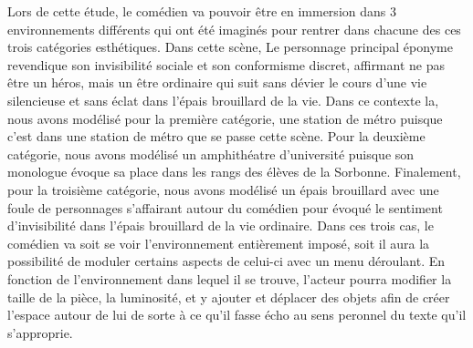 Lors de cette étude, le comédien va pouvoir être en immersion dans 3 environnements différents qui ont été imaginés pour rentrer
dans chacune des ces trois catégories esthétiques. Dans cette scène, Le personnage principal éponyme revendique son invisibilité 
sociale et son conformisme discret, affirmant ne pas être un héros, mais un être ordinaire qui suit sans dévier le cours d'une vie
silencieuse et sans éclat dans l'épais brouillard de la vie. Dans ce contexte la, nous avons modélisé pour la première catégorie, une 
station de métro puisque c'est dans une station de métro que se passe cette scène. Pour la deuxième catégorie, nous avons modélisé un
amphithéatre d'université puisque son monologue évoque sa place dans les rangs des élèves de la Sorbonne. Finalement, pour la troisième 
catégorie, nous avons modélisé un épais brouillard avec une foule de personnages s'affairant autour du comédien pour évoqué le sentiment d'invisibilité dans l'épais brouillard de la vie ordinaire.
Dans ces trois cas, le comédien va soit se voir l'environnement entièrement imposé, soit il aura la possibilité de moduler certains aspects
de celui-ci avec un menu déroulant. En fonction de l'environnement dans lequel il se trouve, l'acteur pourra modifier la taille de la pièce, la luminosité, et
y ajouter et déplacer des objets afin de créer l'espace autour de lui de sorte à ce qu'il fasse écho au sens peronnel du texte qu'il s'approprie. 

